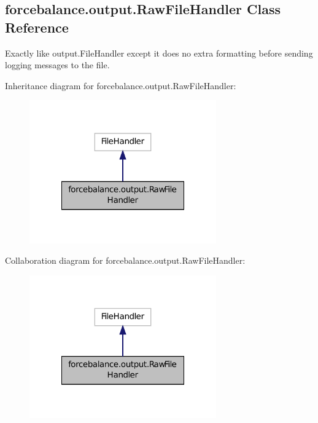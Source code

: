 \hypertarget{classforcebalance_1_1output_1_1RawFileHandler}{\subsection{forcebalance.\-output.\-Raw\-File\-Handler Class Reference}
\label{classforcebalance_1_1output_1_1RawFileHandler}
}


Exactly like output.\-File\-Handler except it does no extra formatting before sending logging messages to the file.  




Inheritance diagram for forcebalance.\-output.\-Raw\-File\-Handler\-:\nopagebreak
\begin{figure}[H]
\begin{center}
\leavevmode
\includegraphics[width=228pt]{classforcebalance_1_1output_1_1RawFileHandler__inherit__graph}
\end{center}
\end{figure}


Collaboration diagram for forcebalance.\-output.\-Raw\-File\-Handler\-:\nopagebreak
\begin{figure}[H]
\begin{center}
\leavevmode
\includegraphics[width=228pt]{classforcebalance_1_1output_1_1RawFileHandler__coll__graph}
\end{center}
\end{figure}
